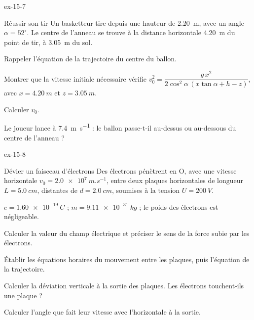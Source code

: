 \begin{blocLivre}{ex-15-7}
\begin{exercice}[2]{Réussir son tir}
Un basketteur tire depuis une hauteur de \qty{2,20}{m}, avec un angle $\alpha=52^\circ$. Le centre de l'anneau se trouve à
la distance horizontale \qty{4,20}{m} du point de tir, à \qty{3,05}{m} du sol.
\begin{questions}
\item Rappeler l'équation de la trajectoire du centre du ballon.
\item Montrer que la vitesse initiale nécessaire vérifie
$v_0^2=\dfrac{g\,x^2}{2\cos^2\alpha\,(x\tan\alpha+h-z)}$, avec $x=\qty{4,20}{m}$ et $z=\qty{3,05}{m}$.
\item Calculer $v_0$.
\item Le joueur lance à \qty{7,4}{m.s^{-1}} : le ballon passe-t-il au-dessus ou au-dessous du centre de l'anneau ?
\end{questions}
\end{exercice}
\end{blocLivre}
\begin{blocLivre}{ex-15-8}
\begin{exercice}[2]{Dévier un faisceau d'électrons}
Des électrons pénètrent en O, avec une vitesse horizontale $v_0=\qty{2,0e7}{m.s^{-1}}$, entre deux plaques horizontales de
longueur $L=\qty{5,0}{cm}$, distantes de $d=\qty{2,0}{cm}$, soumises à la tension $U=\qty{200}{V}$.
\begin{donnees}
$e=\qty{1,60e-19}{C}$ ; $m=\qty{9,11e-31}{kg}$ ; le poids des électrons est négligeable.
\end{donnees}
\begin{questions}
\item Calculer la valeur du champ électrique et préciser le sens de la force subie par les électrons.
\item Établir les équations horaires du mouvement entre les plaques, puis l'équation de la trajectoire.
\item Calculer la déviation verticale à la sortie des plaques. Les électrons touchent-ils une plaque ?
\item Calculer l'angle que fait leur vitesse avec l'horizontale à la sortie.
\end{questions}
\end{exercice}
\end{blocLivre}
